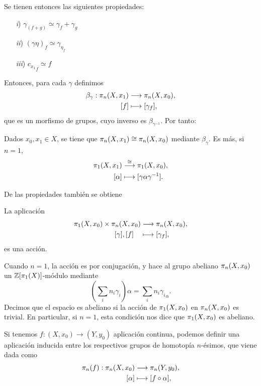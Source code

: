 Se tienen entonces las siguientes propiedades: \par
\begin{enumerate}

\item[\textit{i})] $\gamma_{(f+g)} \simeq \gamma_f + \gamma_g$
\item[\textit{ii})] $(\gamma \eta)_f \simeq \gamma_{\eta_f}$
\item[\textit{iii})] ${c_{x_1}}_f \simeq f$
\end{enumerate}
Entonces, para cada $\gamma$ definimos
\begin{align*}
\beta_\gamma : \homot{n}{X, x_1} &\longrightarrow \homot{n}{X, x_0}, \\
[f] &\longmapsto [\gamma_f],
\end{align*}
que es un morfismo de grupos, cuyo inverso es $\beta_{\gamma^{-1}}$. Por tanto:
\begin{teor}
Dados $x_0, x_1 \in X$, se tiene que $\pi_{n}(X, x_1) \cong \pi_{n}(X, x_0)$ mediante $\beta_\gamma$.
Es más, si $n=1$,
\begin{align*}
\homot{1}{X, x_1} &\stackrel{\cong}{\longrightarrow} \homot{1}{X, x_0}, \\
[\alpha] &\longmapsto [\gamma \alpha \gamma^{-1}].
\end{align*}
\end{teor}
De las propiedades también se obtiene
\begin{teorf}
La aplicación 
\begin{align*}
\homot{1}{X, x_0} \times \homot{n}{X, x_0} &\longrightarrow \homot{n}{X, x_0}, \\
[\gamma] ,  [f] \quad &\longmapsto [\gamma_f],
\end{align*}
es una acción.
\end{teorf}
Cuando $n = 1$, la acción es por conjugación, y hace al grupo abeliano $\pi_{n}(X, x_0)$ un $\mathbb{Z}[\pi_{1}(X)]$-módulo mediante
\[
\left( \sum_i n_i \gamma_i \right) \alpha = \sum_i n_i {\gamma_i}_\alpha.
\]
Decimos que el espacio es abeliano si la acción de $\pi_{1}(X, x_0)$ en $\pi_{n}(X, x_0)$ es trivial. En particular, si $n=1$, esta condición nos dice que $\pi_{1}(X, x_0)$ es abeliano. \par
Si tenemos $f : (X, x_0) \longrightarrow (Y, y_0)$ aplicación continua, podemos definir una aplicación inducida entre los respectivos grupos de homotopía $n$-ésimos, que viene dada como
\begin{align*}
\homot{n}{f} : \homot{n}{X, x_0} &\longrightarrow \homot{n}{Y, y_0}, \\
[\alpha] & \longmapsto [f \circ \alpha],
\end{align*}
